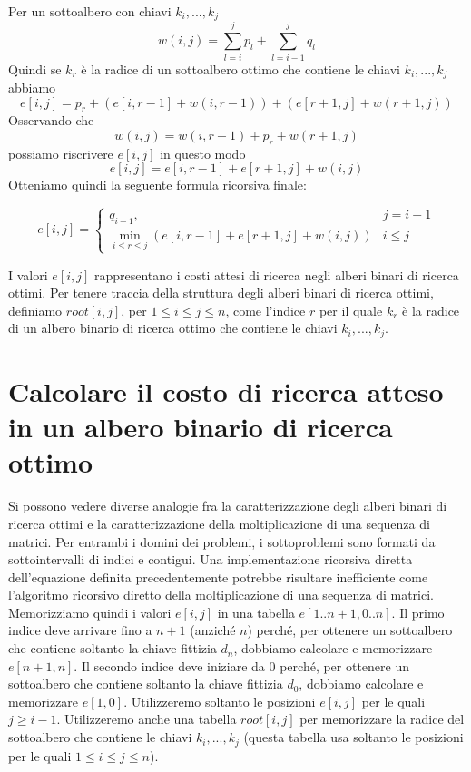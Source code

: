 Per un sottoalbero con chiavi $k_i, ..., k_j$
$$
  w(i , j) = \sum_{l = i}^{j} p_l + \sum_{l = i - 1}^{j} q_l
$$
Quindi se $k_r$ è la radice di un sottoalbero ottimo che contiene le
chiavi $k_i, ..., k_j$ abbiamo
$$
  e[i,j] = p_r + (e[i, r-1] + w(i, r-1)) + (e[r+1, j] + w(r+1, j))
$$
Osservando che
$$
  w(i,j) = w(i, r-1) + p_r + w(r+1, j)
$$
possiamo riscrivere $e[i,j]$ in questo modo
$$
  e[i,j] = e[i, r-1] + e[r+1, j] + w(i,j)
$$
Otteniamo quindi la seguente formula ricorsiva finale:

\begin{equation*}
  e[i,j] =
  \begin{cases}
    q_{i-1},                                              & j = i-1 \\
    \min_{i \le r \le j} (e[i, r-1] + e[r+1, j] + w(i,j)) & i \le j
  \end{cases}
\end{equation*}

I valori $e[i,j]$ rappresentano i costi attesi di ricerca negli alberi
binari di ricerca ottimi. Per tenere traccia della struttura degli
alberi binari di ricerca ottimi, definiamo $root[i,j]$, per
$1 \le i \le j \le n$, come l'indice $r$ per il quale $k_r$ è la
radice di un albero binario di ricerca ottimo che contiene le chiavi
$k_i , ..., k_j$.

\section{Calcolare il costo di ricerca atteso in un albero binario di ricerca ottimo}

Si possono vedere diverse analogie fra la caratterizzazione degli alberi
binari di ricerca ottimi e la caratterizzazione della moltiplicazione di
una sequenza di matrici. Per entrambi i domini dei problemi, i
sottoproblemi sono formati da sottointervalli di indici e contigui. Una
implementazione ricorsiva diretta dell'equazione definita
precedentemente potrebbe risultare inefficiente come l'algoritmo
ricorsivo diretto della moltiplicazione di una sequenza di matrici.\\
Memorizziamo quindi i valori $e[i,j]$ in una tabella
$e[1..n +1, 0..n]$. Il primo indice deve arrivare fino a $n+1$
(anziché $n$) perché, per ottenere un sottoalbero che contiene
soltanto la chiave fittizia $d_n$, dobbiamo calcolare e memorizzare
$e[n+1,n]$. Il secondo indice deve iniziare da 0 perché, per ottenere
un sottoalbero che contiene soltanto la chiave fittizia $d_0$,
dobbiamo calcolare e memorizzare $e[1,0]$. Utilizzeremo soltanto le
posizioni $e[i,j]$ per le quali $j \ge i-1$. Utilizzeremo anche una
tabella $root[i,j]$ per memorizzare la radice del sottoalbero che
contiene le chiavi $k_i, ..., k_j$ (questa tabella usa soltanto le
posizioni per le quali $1 \le i \le j \le n$).\\


